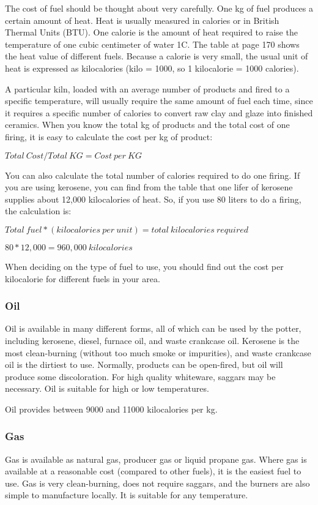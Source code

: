 The cost of fuel should be thought about very carefully. One kg of fuel 
produces a certain amount of heat. Heat is usually measured in calories or in 
British Thermal Units (BTU). One calorie is the amount of heat required to 
raise the temperature of one cubic centimeter of water 1\degree C. The table at 
page 170 shows the heat value of different fuels. Because a calorie is very 
small, the usual unit of heat is expressed as kilocalories (kilo = 1000, so 1 
kilocalorie = 1000 calories).

A particular kiln, loaded with an average number of products and fired to a 
specific temperature, will usually require the same amount of fuel each time, 
since it requires a specific number of calories to convert raw clay and glaze 
into finished ceramics. When you know the total kg of products and the total 
cost of one firing, it is easy to calculate the cost per kg of product:

\(Total~Cost/Total~KG = Cost~per~KG\)

You can also calculate the total number of calories required to do one firing. 
If you are using kerosene, you can find from the table that one lifer of 
kerosene supplies about 12,000 kilocalories of heat. So, if you use 80 liters 
to do a firing, the calculation is:

\(Total~fuel*(kilocalories~per~unit) = total~kilocalories~required\)

\(80*12,000=960,000~kilocalories\)

When deciding on the type of fuel to use, you should find out the cost per 
kilocalorie for different fuels in your area.
\subsubsection{Oil}
Oil is available in many different forms, all of which can be used by the 
potter, including kerosene, diesel, furnace oil, and waste crankcase oil. 
Kerosene is the most clean-burning (without too much smoke or impurities), and 
waste crankcase oil is the dirtiest to use. Normally, products can be 
open-fired, but oil will produce some discoloration. For high quality 
whiteware, saggars may be necessary. Oil is suitable for high or low 
temperatures.

Oil provides between 9000 and 11000 kilocalories per kg.
\subsubsection{Gas}
Gas is available as natural gas, producer gas or liquid propane gas. Where gas 
is available at a reasonable cost (compared to other fuels), it is the easiest 
fuel to use. Gas is very clean-burning, does not require saggars, and the 
burners are also simple to manufacture locally. It is suitable for any 
temperature.
